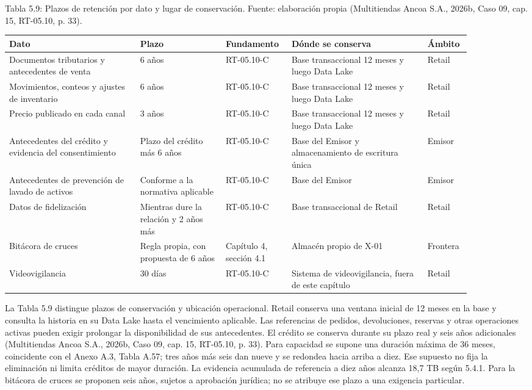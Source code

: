 \documentclass[11pt]{article}
\begin{document}
\par\vspace{0.6\baselineskip}\noindent\begin{minipage}{\linewidth}
Tabla 5.9: Plazos de retención por dato y lugar de conservación. Fuente: elaboración propia (Multitiendas Ancoa S.A., 2026b, Caso 09, cap. 15, RT-05.10, p. 33).\label{tab:t14}\par\vspace{0.3\baselineskip}
\begin{tabular}{@{}p{0.264\linewidth}p{0.172\linewidth}p{0.106\linewidth}p{0.270\linewidth}p{0.066\linewidth}@{}}
\toprule Dato & Plazo & Fundamento & Dónde se conserva & Ámbito \\
\midrule
Documentos tributarios y antecedentes de venta & 6 años & RT-05.10-C & Base transaccional 12 meses y luego Data Lake & Retail \\
Movimientos, conteos y ajustes de inventario & 6 años & RT-05.10-C & Base transaccional 12 meses y luego Data Lake & Retail \\
Precio publicado en cada canal & 3 años & RT-05.10-C & Base transaccional 12 meses y luego Data Lake & Retail \\
Antecedentes del crédito y evidencia del consentimiento & Plazo del crédito más 6 años & RT-05.10-C & Base del Emisor y almacenamiento de escritura única & Emisor \\
Antecedentes de prevención de lavado de activos & Conforme a la normativa aplicable & RT-05.10-C & Base del Emisor & Emisor \\
Datos de fidelización & Mientras dure la relación y 2 años más & RT-05.10-C & Base transaccional de Retail & Retail \\
Bitácora de cruces & Regla propia, con propuesta de 6 años & Capítulo 4, sección 4.1 & Almacén propio de X-01 & Frontera \\
Videovigilancia & 30 días & RT-05.10-C & Sistema de videovigilancia, fuera de este capítulo & Retail \\
\bottomrule
\end{tabular}
\end{minipage}
\par


La Tabla 5.9 distingue plazos de conservación y ubicación operacional. Retail conserva una ventana inicial de 12 meses en la base y consulta la historia en su Data Lake hasta el vencimiento aplicable. Las referencias de pedidos, devoluciones, reservas y otras operaciones activas pueden exigir prolongar la disponibilidad de sus antecedentes. El crédito se conserva durante su plazo real y seis años adicionales (Multitiendas Ancoa S.A., 2026b, Caso 09, cap. 15, RT-05.10, p. 33). Para capacidad se supone una duración máxima de 36 meses, coincidente con el Anexo A.3, Tabla A.57; tres años más seis dan nueve y se redondea hacia arriba a diez. Ese supuesto no fija la eliminación ni limita créditos de mayor duración. La evidencia acumulada de referencia a diez años alcanza 18,7 TB según 5.4.1. Para la bitácora de cruces se proponen seis años, sujetos a aprobación jurídica; no se atribuye ese plazo a una exigencia particular.
\end{document}
